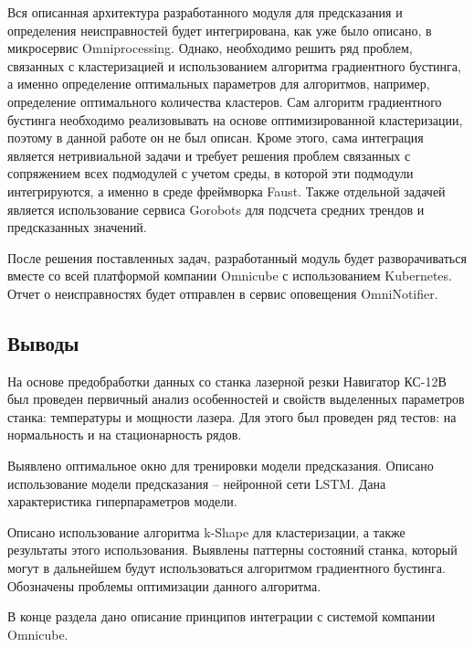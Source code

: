 Вся описанная архитектура разработанного модуля
для предсказания и определения неисправностей будет интегрирована,
как уже было описано, в микросервис Omniprocessing.
Однако, необходимо решить ряд проблем,
связанных с кластеризацией и использованием алгоритма градиентного бустинга,
а именно определение оптимальных параметров для алгоритмов,
например, определение оптимального количества кластеров.
Сам алгоритм градиентного бустинга необходимо реализовывать на основе оптимизированной кластеризации,
поэтому в данной работе он не был описан.
Кроме этого, сама интеграция является нетривиальной задачи
и требует решения проблем связанных с сопряжением всех подмодулей
с учетом среды, в которой эти подмодули интегрируются,
а именно в среде фреймворка Faust.
Также отдельной задачей является использование сервиса Gorobots
для подсчета средних трендов и предсказанных значений.

После решения поставленных задач,
разработанный модуль будет разворачиваться
вместе со всей платформой компании Omnicube
с использованием Kubernetes.
Отчет о неисправностях будет отправлен
в сервис оповещения OmniNotifier.

\subsection{Выводы}

На основе предобработки данных со станка лазерной резки Навигатор КС-12В
был проведен первичный анализ особенностей и свойств выделенных параметров станка:
температуры и мощности лазера.
Для этого был проведен ряд тестов: на нормальность и на стационарность рядов.

Выявлено оптимальное окно для тренировки модели предсказания.
Описано использование модели предсказания -- нейронной сети LSTM.
Дана характеристика гиперпараметров модели.

Описано использование алгоритма k-Shape для кластеризации,
а также результаты этого использования.
Выявлены паттерны состояний станка, который могут
в дальнейшем будут использоваться алгоритмом градиентного бустинга.
Обозначены проблемы оптимизации данного алгоритма.

В конце раздела дано описание принципов интеграции с системой компании Omnicube.

\clearpage